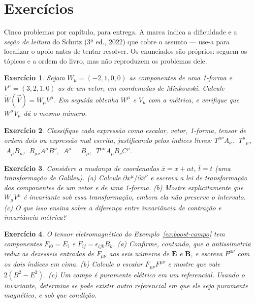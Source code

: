 \documentclass[12pt,a4paper,oneside]{book}
\theoremstyle{rgplain}
\newtheorem{exercise}{Exercício}[chapter]
\theoremstyle{rgremark}
\begin{document}
\clearpage
\section{Exercícios}
\begin{leitura}
Cinco problemas por capítulo, para entrega. A marca indica a dificuldade e a \emph{seção de leitura} do Schutz (3ª ed., 2022) que cobre o assunto --- use-a para localizar o apoio antes de tentar resolver. Os enunciados são próprios: seguem os tópicos e a ordem do livro, mas não reproduzem os problemas dele.
\end{leitura}

\begin{exercise}
Sejam $W_\mu=(-2,1,0,0)$ as componentes de uma 1-forma e
$V^\mu=(3,2,1,0)$ as de um vetor, em coordenadas de Minkowski. Calcule
$\tilde W(\vec V)=W_\mu V^\mu$. Em seguida obtenha $W^\mu$ e $V_\mu$ com a
métrica, e verifique que $W^\mu V_\mu$ dá o mesmo número.
\end{exercise}

\begin{exercise}
Classifique cada expressão como escalar, vetor, 1-forma, tensor de ordem
dois ou expressão mal escrita, justificando pelos índices livres:
$T^{\mu\nu}A_\nu$, $\;T^{\mu}{}_{\mu}$, $\;A_\mu B_\mu$, $\;R_{\mu\nu}A^\mu
B^\nu$, $\;A^\mu=B_\mu$, $\;T^{\mu\nu}A_\mu B_\nu C^\rho$.
\end{exercise}

\begin{exercise}
Considere a mudança de coordenadas $\bar x=x+\alpha t$, $\bar t=t$ (uma transformação
de Galileu). (a) Calcule $\partial x^\mu/\partial \bar x^\nu$ e escreva a lei de
transformação das componentes de um vetor e de uma 1-forma. (b) Mostre
explicitamente que $W_\mu V^\mu$ é invariante sob essa transformação,
\emph{embora} ela não preserve o intervalo. (c) O que isso ensina sobre a
diferença entre invariância de contração e invariância métrica?
\end{exercise}

\begin{exercise}
O tensor eletromagnético do Exemplo~\ref{ex:boost-campo} tem componentes
$F_{i0}=E_i$ e $F_{ij}=\epsilon_{ijk}B_k$. (a) Confirme, contando, que a
antissimetria reduz as dezesseis entradas de $F_{\mu\nu}$ aos seis números de
$\bm E$ e $\bm B$, e escreva $F^{\mu\nu}$ com os dois índices em cima.
(b) Calcule o escalar $F_{\mu\nu}F^{\mu\nu}$ e mostre que vale $2(B^2-E^2)$.
(c) Um campo é puramente elétrico em um referencial. Usando o invariante,
determine se pode existir outro referencial em que ele seja puramente
magnético, e sob que condição.
\end{exercise}
\end{document}
